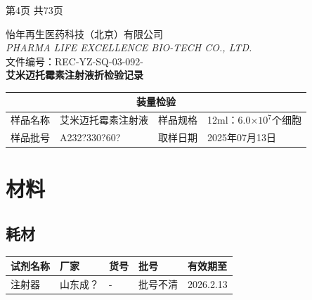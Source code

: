 \documentclass[UTF8,10pt,a4paper,fontset=fandol]{ctexart}
\newcommand{\fieldvalue}[1]{#1}
\newcommand{\handwritten}[1]{#1}
\begin{document}
\begin{center}
第4页 共73页
\end{center}

\newpage

\begin{center}
\small
怡年再生医药科技（北京）有限公司\\
\textit{PHARMA LIFE EXCELLENCE BIO-TECH CO., LTD.}\\[2mm]
文件编号：REC-YZ-SQ-03-092-\underline{\hspace{8mm}}\\
\textbf{艾米迈托霉素注射液折检验记录}
\end{center}

\begin{center}
\begin{tabular}{|p{}|p{}|p{}|p{}|}
\hline
\multicolumn{4}{|c|}{装量检验}\\
\hline
样品名称 & 艾米迈托霉素注射液 & 样品规格 & 12ml：6.0$\times 10^{7}$个细胞\\
\hline
样品批号 &
\fieldvalue{\handwritten{A232?330?60?}} &
取样日期 &
\fieldvalue{\handwritten{2025年07月13日}}\\
\hline
\end{tabular}
\end{center}

\section{材料}

\subsection{耗材}

\begin{center}
\begin{tabular}{|p{}|p{}|p{}|p{}|p{}|}
\hline
试剂名称 & 厂家 & 货号 & 批号 & 有效期至\\
\hline
注射器 &
\fieldvalue{\handwritten{山东成？}} &
\fieldvalue{\handwritten{-}} &
\fieldvalue{\handwritten{批号不清}} &
\fieldvalue{\handwritten{2026.2.13}}\\
\hline
\end{tabular}
\end{center}
\end{document}
